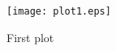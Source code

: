 \begin{figure}[H]
    \begin{center}
        \texttt{[image: plot1.eps]}
    \end{center}
    \caption{First plot}
    \label{fig:figure1}
\end{figure}
